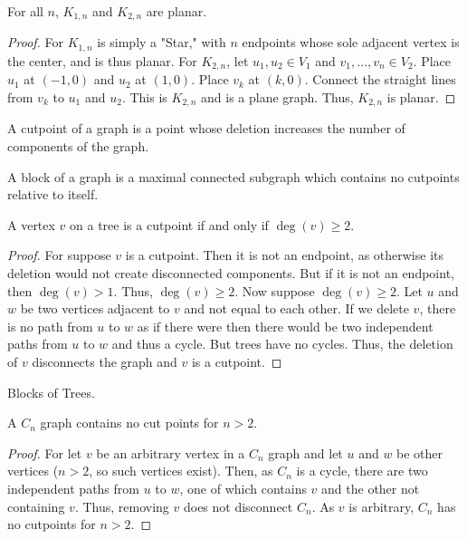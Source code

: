 \documentclass[crop=false,class=book,oneside]{standalone}
\begin{document}
\begin{theorem}
For all $n$, $K_{1,n}$ and $K_{2,n}$ are planar.
\end{theorem}
\begin{proof}
For $K_{1,n}$ is simply a "Star," with $n$ endpoints whose sole adjacent vertex is the center, and is thus planar. For $K_{2,n}$, let $u_1,u_2 \in V_1$ and $v_1,\hdots, v_n \in V_2$. Place $u_1$ at $(-1,0)$ and $u_2$ at $(1,0)$. Place $v_k$ at $(k,0)$. Connect the straight lines from $v_k$ to $u_1$ and $u_2$. This is $K_{2,n}$ and is a plane graph. Thus, $K_{2,n}$ is planar.
\end{proof}
\begin{definition}
A cutpoint of a graph is a point whose deletion increases the number of components of the graph.
\end{definition}
\begin{definition}
A block of a graph is a maximal connected subgraph which contains no cutpoints relative to itself.
\end{definition}
\begin{theorem}
A vertex $v$ on a tree is a cutpoint if and only if $\deg(v) \geq 2$.
\end{theorem}
\begin{proof}
For suppose $v$ is a cutpoint. Then it is not an endpoint, as otherwise its deletion would not create disconnected components. But if it is not an endpoint, then $\deg(v)>1$. Thus, $\deg(v)\geq 2$. Now suppose $\deg(v) \geq 2$. Let $u$ and $w$ be two vertices adjacent to $v$ and not equal to each other. If we delete $v$, there is no path from $u$ to $w$ as if there were then there would be two independent paths from $u$ to $w$ and thus a cycle. But trees have no cycles. Thus, the deletion of $v$ disconnects the graph and $v$ is a cutpoint.
\end{proof}
\begin{theorem}
Blocks of Trees.
\end{theorem}
\begin{corollary}
A $C_n$ graph contains no cut points for $n>2$.
\end{corollary}
\begin{proof}
For let $v$ be an arbitrary vertex in a $C_n$ graph and let $u$ and $w$ be other vertices ($n>2$, so such vertices exist). Then, as $C_n$ is a cycle, there are two independent paths from $u$ to $w$, one of which contains $v$ and the other not containing $v$. Thus, removing $v$ does not disconnect $C_n$. As $v$ is arbitrary, $C_n$ has no cutpoints for $n>2$.
\end{proof}
\end{document}
